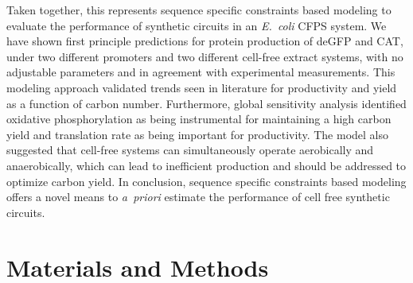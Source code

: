 \documentclass[journal=asbcd6,manuscript=article]{achemso}
\begin{document}
Taken together, this represents sequence specific constraints based modeling to evaluate the performance of synthetic circuits in an \emph{E.~coli} CFPS system.
We have shown first principle predictions for protein production of deGFP and CAT, under two different promoters and two different cell-free extract systems, with no adjustable parameters and in agreement with experimental measurements.
This modeling approach validated trends seen in literature for productivity and yield as a function of carbon number.
Furthermore, global sensitivity analysis identified oxidative phosphorylation as being instrumental for maintaining a high carbon yield and translation rate as being important for productivity.
The model also suggested that cell-free systems can simultaneously operate aerobically and anaerobically, which can lead to inefficient production and should be addressed to optimize carbon yield.
In conclusion, sequence specific constraints based modeling offers a novel means to \emph{a~priori} estimate the performance of cell free synthetic circuits.

\section*{Materials and Methods}
\end{document}
